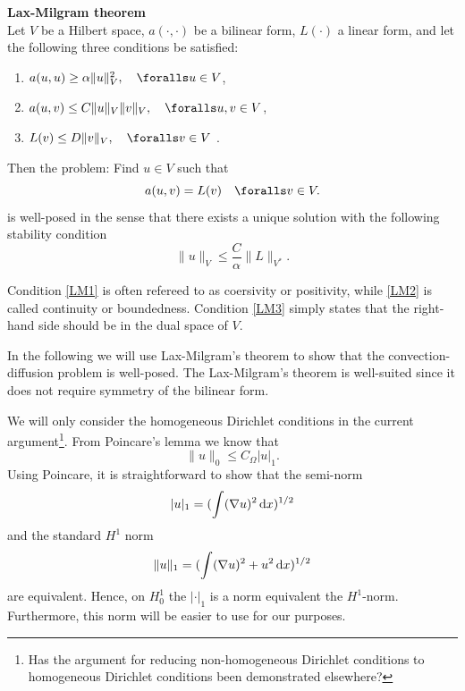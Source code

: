 \begin{theorem}{\textbf{Lax-Milgram theorem}} \\
Let $V$ be a Hilbert space, $a(\cdot, \cdot)$ be 
a bilinear form, $L(\cdot)$ a linear form, and let the following three conditions be satisfied: 
\begin{enumerate}
\item $a(u,u) \ge \alpha \|u\|^2_V, \quad \foralls u \in V$,  \label{LM1} 
\item $a(u,v) \le C \|u\|_V \|v\|_V, \quad \foralls u, v \in V$,  \label{LM2} 
\item $L(v) \le D \| v \|_V, \quad \foralls v \in V$ .  \label{LM3} 
\end{enumerate}
Then the problem: Find $u\in V$ such that 
\[
a(u,v) = L(v) \quad \foralls v \in V. 
\]
is well-posed in the sense that there exists a unique solution with the following 
stability condition
\[
\|u \|_V \le \frac{C}{\alpha} \|L\|_{V^*} .  
\]
\end{theorem}
Condition \eqref{LM1} is often refereed to as coersivity or positivity, while
\eqref{LM2} is called continuity or boundedness. Condition \ref{LM3} simply
states that the right-hand side should be in the dual space of $V$.    

In the following we will use Lax-Milgram's theorem to show that the convection-diffusion problem is well-posed. 
The Lax-Milgram's theorem is well-suited since it does not require symmetry of the bilinear form. 


We will only consider the homogeneous Dirichlet conditions in the current 
argument\footnote{Has the argument for reducing non-homogeneous Dirichlet conditions
to homogeneous Dirichlet conditions been demonstrated elsewhere?}.   
From Poincare's lemma we know  that 
\[
\|u\|_0 \le C_\Omega |u|_1.  
\]
Using Poincare, it is straightforward to show that the 
semi-norm     
\[
|u|_1 = (\int (\nabla u)^2   \, \mathrm{d}x)^{1/2}  
\]
and the standard $H^1$ norm 
\[
\|u \|_1  = (\int (\nabla u)^2 + u^2  \, \mathrm{d}x)^{1/2}  
\]
are equivalent. Hence, on $H^1_0$ the $|\cdot|_1$ is a norm
equivalent the $H^1$-norm. Furthermore, this norm will be easier to 
use for our purposes.  

